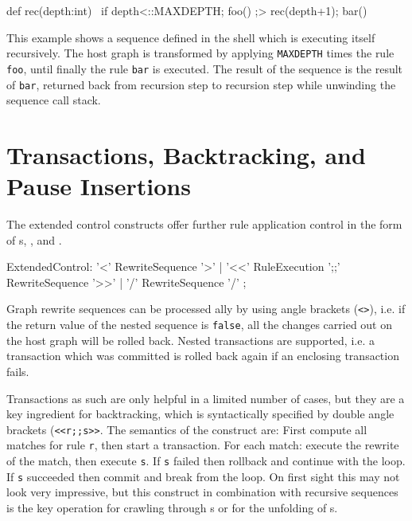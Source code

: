 \begin{example}
\label{ex:recseq}
\begin{grgen}
def rec(depth:int) {\
  if{ {depth<::MAXDEPTH}; foo() ;> rec(depth+1); bar() }\
}
\end{grgen}
This example shows a sequence defined in the shell which is executing itself recursively.
The host graph is transformed by applying \texttt{MAXDEPTH} times the rule \texttt{foo}, until finally the rule \texttt{bar} is executed. The result of the sequence is the result of \texttt{bar}, returned back from recursion step to recursion step while unwinding the sequence call stack. 
\end{example}


\section{Transactions, Backtracking, and Pause Insertions}\label{sec:extctrl}

The extended control constructs offer further rule application control in the form of s, , and .

\begin{rail} 
  ExtendedControl: 
    '<' RewriteSequence '>' | 
    '<<' RuleExecution ';;' RewriteSequence '>>' |
    '/' RewriteSequence '/'
	;
\end{rail}

Graph rewrite sequences can be processed ally by using angle brackets (\texttt{<>}), i.e.
if the return value of the nested sequence is \texttt{false}, all the changes carried out on the host graph will be rolled back.
Nested transactions\indexmainsee{nested transaction}{transaction} are supported, i.e. a transaction which was committed is rolled back again if an enclosing transaction fails.

Transactions as such are only helpful in a limited number of cases, but they are a key ingredient for backtracking, which is syntactically specified by double angle brackets (\texttt{<<r;;s>>}.
The semantics of the construct are:
First compute all matches for rule \texttt{r}, then start a transaction.
For each match: execute the rewrite of the match, then execute \texttt{s}.
If \texttt{s} failed then rollback and continue with the loop.
If \texttt{s} succeeded then commit and break from the loop.
On first sight this may not look very impressive, but this construct in combination with recursive sequences is the key operation for crawling through s or for the unfolding of s.

